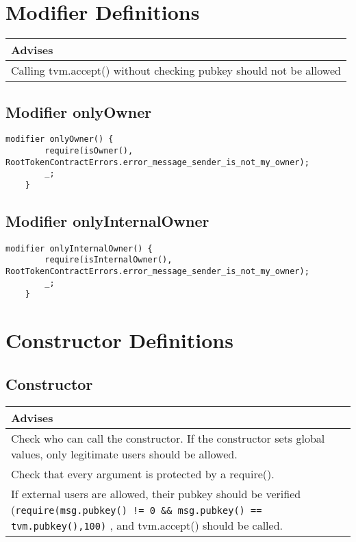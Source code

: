 \section{Modifier Definitions}


\ifsoldraft
\noindent\begin{tabular}{|p{12cm}|}\hline
\rowcolor{green}Advises
\\\hline
Calling tvm.accept() without checking pubkey should not be allowed
\\\hline\end{tabular}
\fi

\subsection{Modifier onlyOwner}


\begin{lstlisting}[firstnumber=458]
    modifier onlyOwner() {
        require(isOwner(), RootTokenContractErrors.error_message_sender_is_not_my_owner);
        _;
    }
\end{lstlisting}

\subsection{Modifier onlyInternalOwner}


\begin{lstlisting}[firstnumber=463]
    modifier onlyInternalOwner() {
        require(isInternalOwner(), RootTokenContractErrors.error_message_sender_is_not_my_owner);
        _;
    }
\end{lstlisting}

\section{Constructor Definitions}


\subsection{Constructor}

\ifsoldraft
\noindent\begin{tabular}{|p{12cm}|}\hline
\rowcolor{green}Advises
\\\hline
Check who can call the constructor. If the constructor sets global values, only legitimate users should be allowed.
\\\hline
Check that every argument is protected by a require().
\\\hline
If external users are allowed, their pubkey should be verified (\verb+require(msg.pubkey() != 0 && msg.pubkey() == tvm.pubkey(),100)+ , and tvm.accept() should be called.
\\\hline\end{tabular}
\fi

